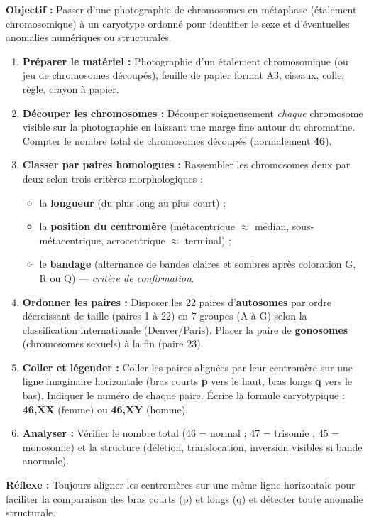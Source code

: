 \documentclass[11pt]{article}
\begin{document}
\begin{methode}
    \textbf{Objectif :} Passer d'une photographie de chromosomes en métaphase (étalement chromosomique) à un caryotype ordonné pour identifier le sexe et d'éventuelles anomalies numériques ou structurales.
    \begin{enumerate}
        \item \textbf{Préparer le matériel :} Photographie d'un étalement chromosomique (ou jeu de chromosomes découpés), feuille de papier format A3, ciseaux, colle, règle, crayon à papier.
        \item \textbf{Découper les chromosomes :} Découper soigneusement \emph{chaque} chromosome visible sur la photographie en laissant une marge fine autour du chromatine. Compter le nombre total de chromosomes découpés (normalement \textbf{46}).
        \item \textbf{Classer par paires homologues :} Rassembler les chromosomes deux par deux selon trois critères morphologiques : 
        \begin{itemize}
            \item la \textbf{longueur} (du plus long au plus court) ;
            \item la \textbf{position du centromère} (métacentrique $\approx$ médian, sous-métacentrique, acrocentrique $\approx$ terminal) ;
            \item le \textbf{bandage} (alternance de bandes claires et sombres après coloration G, R ou Q) — \emph{critère de confirmation}.
        \end{itemize}
        \item \textbf{Ordonner les paires :} Disposer les 22 paires d'\textbf{autosomes} par ordre décroissant de taille (paires 1 à 22) en 7 groupes (A à G) selon la classification internationale (Denver/Paris). Placer la paire de \textbf{gonosomes} (chromosomes sexuels) à la fin (paire 23).
        \item \textbf{Coller et légender :} Coller les paires alignées par leur centromère sur une ligne imaginaire horizontale (bras courts \textbf{p} vers le haut, bras longs \textbf{q} vers le bas). Indiquer le numéro de chaque paire. Écrire la formule caryotypique : \textbf{46,XX} (femme) ou \textbf{46,XY} (homme).
        \item \textbf{Analyser :} Vérifier le nombre total (46 = normal ; 47 = trisomie ; 45 = monosomie) et la structure (délétion, translocation, inversion visibles si bande anormale).
    \end{enumerate}
    \textbf{Réflexe :} Toujours aligner les centromères sur une même ligne horizontale pour faciliter la comparaison des bras courts (p) et longs (q) et détecter toute anomalie structurale.
\end{methode}
\end{document}
